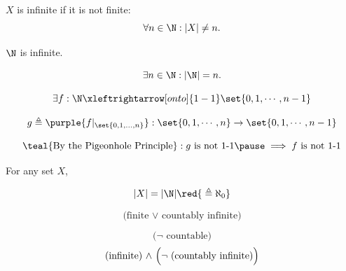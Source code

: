 \begin{frame}{}
  \begin{definition}[Infinite]
    $X$ is infinite if it is not finite:
    \[
      \forall n \in \N: |X| \neq n.
    \]
  \end{definition}

  \pause
  \begin{theorem}
    $\N$ is infinite. 
  \end{theorem}

  \pause
  \begin{center}

    \pause
    \vspace{-0.30cm}
    \[
      \exists n \in \N: |\N| = n.
    \]

    \pause
    \vspace{-0.30cm}
    \[
      \exists f: \N \xleftrightarrow[onto]{1-1} \set{0, 1, \cdots, n-1}
    \]

    \pause
    \vspace{-0.30cm}
    \[
      g \triangleq \purple{f|_{\set{0, 1, \ldots, n}}}: \set{0, 1, \cdots, n} \to \set{0, 1, \cdots, n-1}
    \]

    \pause
    \vspace{-0.30cm}
    \[
      \text{\teal{By the Pigeonhole Principle}}: g \text{ is not 1-1} \pause \implies f \text{ is not 1-1}
    \]
  \end{center}
\end{frame}

\begin{frame}{}
  \begin{definition}[Infinite]
    For any set $X$,
    \begin{description}
      \item[Countably Infinite]
        \[
          |X| = |\N| \red{\;\triangleq \aleph_{0}}
        \]
      \item[Countable]
        \[
          \text{(finite $\lor$ countably infinite)}
        \]
      \item[Uncountable]
        \[
          \text{($\lnot$ countable)}
        \]
        \[
          \text{(infinite) $\land$ \Big($\lnot$ (countably infinite)\Big)}
        \]
    \end{description}
  \end{definition}
\end{frame}

